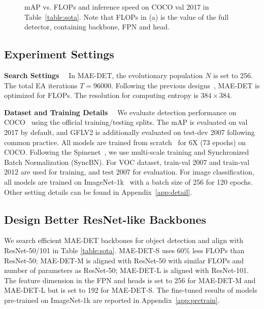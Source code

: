 \documentclass[nohyperref]{article}
\theoremstyle{plain}
\theoremstyle{definition}
\theoremstyle{remark}
\begin{document}
\begin{figure*}[h]
	\centering	
	\caption{mAP vs. FLOPs and inference speed on COCO val 2017 in Table~\ref{table:sota}. Note that FLOPs in (a) is the value of the full detector, containing backbone, FPN and head.}
	\label{fig:sota}	
\end{figure*}

\subsection{Experiment Settings}
\noindent\textbf{Search Settings}$\quad$ 
In MAE-DET, the evolutionary population $N$ is set to 256. The total EA iterations $T=96000$. 
Following the previous designs~\citep{detnas,spnas,spinenet}, MAE-DET is optimized for FLOPs. The resolution for computing entropy is $384\times384$.

\noindent\textbf{Dataset and Training Details}$\quad$ 
We evaluate detection performance on COCO~\citep{coco} using the official training/testing splits. The mAP is evaluated on val 2017 by default, and GFLV2 is additionally evaluated on test-dev 2007 following common practice. All models are trained from scratch~\citep{scratch} for 6X (73 epochs) on COCO. Following the Spinenet~\citep{spinenet}, we use multi-scale training and Synchronized Batch Normalization (SyncBN). For VOC dataset, train-val 2007 and train-val 2012 are used for training, and test 2007 for evaluation. For image classification, all models are trained on ImageNet-1k~\citep{imagenet} with a batch size of 256 for 120 epochs. Other setting details can be found in Appendix~\ref{app:detail}.


\subsection{Design Better ResNet-like Backbones}
\label{sec:compare-MAE-DET-vs-resnet}


We search efficient MAE-DET backbones for object detection and align with ResNet-50/101 in Table \ref{table:sota}. MAE-DET-S uses 60\% less FLOPs than ResNet-50; MAE-DET-M is aligned with ResNet-50 with similar FLOPs and number of parameters as ResNet-50; MAE-DET-L is aligned with ResNet-101. The feature dimension in the FPN and heads is set to 256 for MAE-DET-M and MAE-DET-L but is set to 192 for MAE-DET-S. The fine-tuned results of models pre-trained on ImageNet-1k are reported in Appendix~\ref{app:pretrain}.
\end{document}
